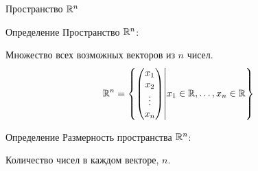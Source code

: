 \begin{frame}{Пространство $\mathbb{R}^n$}

\begin{block}{Определение} 
\alert{Пространство $\mathbb{R}^n$:}

Множество всех возможных векторов из $n$ чисел. 
 \[
 \mathbb{R}^n = \left\{ \begin{pmatrix}
 x_1 \\
 x_2 \\
 \vdots \\
 x_n \\
 \end{pmatrix} \middle| x_1 \in \mathbb{R}, \ldots, x_n \in \mathbb{R}
   \right\}  
 \]
\end{block}

\pause

\begin{block}{Определение} 
  \alert{Размерность} пространства $\mathbb{R}^n$:

    Количество чисел в каждом векторе, $n$.
\end{block}
\end{frame}








